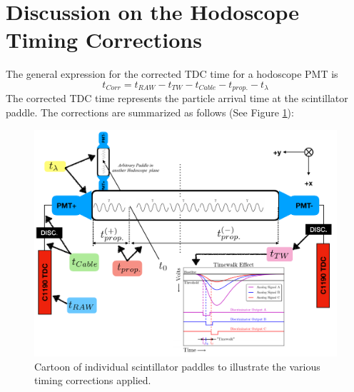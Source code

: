 \documentclass[14pt]{article}
\begin{document}
\section{Discussion on the Hodoscope Timing Corrections}
The general expression for the corrected TDC time for a hodoscope PMT is
\begin{equation}
t_{Corr} = t_{RAW} - t_{TW} - t_{Cable} - t_{prop.} - t_{\lambda} 
\end{equation}
\newpage
The corrected TDC time represents the particle arrival time at the scintillator paddle.
The corrections are summarized as follows (See Figure \ref{fig:Paddle}):
\begin{figure}[H]
  \captionsetup{justification=raggedright,singlelinecheck=false}
  \includegraphics[scale=0.5]{HodoPaddle.pdf}
  \caption{Cartoon of individual scintillator paddles to illustrate the various timing corrections applied.}
  \label{fig:Paddle}
\end{figure}
\end{document}
